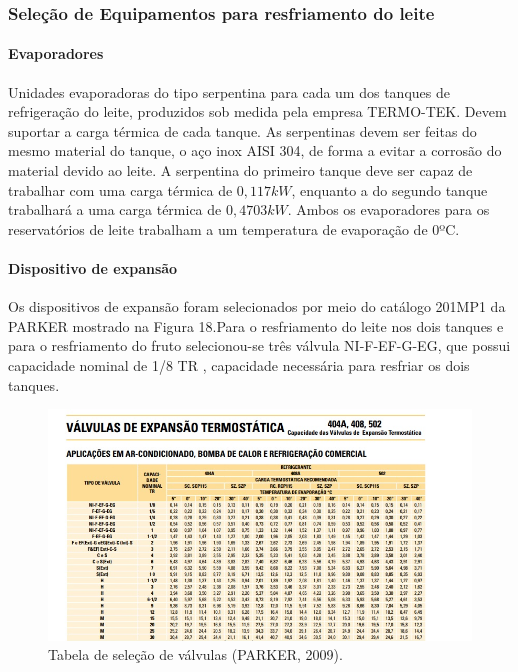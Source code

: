 \documentclass[10pt,a4paper]{article}
\begin{document}
\subsubsection{{Seleção de Equipamentos para resfriamento do leite}}
\paragraph*{{ Evaporadores}}

 Unidades evaporadoras do tipo serpentina para cada um dos tanques de refrigeração do leite, produzidos sob medida pela empresa TERMO-TEK. Devem suportar a carga térmica de cada tanque. As serpentinas devem ser feitas do mesmo material do tanque, o aço inox AISI 304, de forma a evitar a corrosão do material devido ao leite. A serpentina do primeiro tanque deve ser capaz de trabalhar com uma carga térmica de $0,117 kW$, enquanto a do segundo tanque trabalhará a uma carga térmica de $0,4703 kW$. Ambos os evaporadores para os reservatórios de leite trabalham a um temperatura de evaporação de 0ºC.

\paragraph*{{ Dispositivo de expansão}}
Os dispositivos de expansão foram selecionados por meio do catálogo 201MP1 da PARKER mostrado na Figura 18.Para o resfriamento do leite nos dois tanques  e para o resfriamento do fruto selecionou-se três válvula NI-F-EF-G-EG, que possui capacidade nominal de 1/8 TR , capacidade necessária para resfriar os dois tanques.

\begin{figure}[H]
    \centering
    \includegraphics[scale = 0.8]{Figuras/valvula.jpg}
    \caption{Tabela de seleção de válvulas (PARKER, 2009).}
    \label{evaporador_produto_final}
\end{figure}
\end{document}
